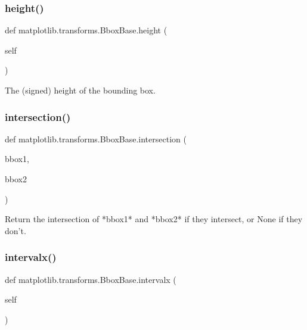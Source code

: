 \subsubsection{\texorpdfstring{height()}{height()}}
{\footnotesize\ttfamily def matplotlib.\+transforms.\+Bbox\+Base.\+height (\begin{DoxyParamCaption}\item[{}]{self }\end{DoxyParamCaption})}

\begin{DoxyVerb}The (signed) height of the bounding box.\end{DoxyVerb}
 \mbox{\label{classmatplotlib_1_1transforms_1_1BboxBase_aec84199e6d97d7d098dae0ee1a6a7466}} 
\subsubsection{\texorpdfstring{intersection()}{intersection()}}
{\footnotesize\ttfamily def matplotlib.\+transforms.\+Bbox\+Base.\+intersection (\begin{DoxyParamCaption}\item[{}]{bbox1,  }\item[{}]{bbox2 }\end{DoxyParamCaption})\hspace{0.3cm}{\ttfamily [static]}}

\begin{DoxyVerb}Return the intersection of *bbox1* and *bbox2* if they intersect, or
None if they don't.
\end{DoxyVerb}
 \mbox{\label{classmatplotlib_1_1transforms_1_1BboxBase_ab88bdc0cd4af576611fb50ee1295395a}} 
\subsubsection{\texorpdfstring{intervalx()}{intervalx()}}
{\footnotesize\ttfamily def matplotlib.\+transforms.\+Bbox\+Base.\+intervalx (\begin{DoxyParamCaption}\item[{}]{self }\end{DoxyParamCaption})}

